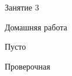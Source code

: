 \begin{class}[number=3]
	\begin{listofex}
		\item Занятие 3
	\end{listofex}
\end{class}

\begin{homework}[number=3]
	\begin{listofex}
		\item Домашняя работа
	\end{listofex}
\end{homework}

\begin{class}[number=4]
	\begin{listofex}
		\item Пусто
	\end{listofex}
\end{class}


\begin{exam}
	\begin{listofex}
		\item Проверочная
	\end{listofex}
\end{exam}

